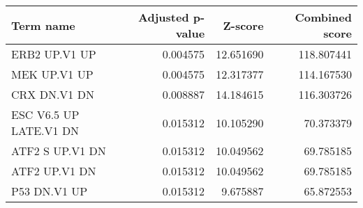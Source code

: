 \begin{tabular}{lrrr}
\toprule
             Term name &  Adjusted p-value &   Z-score &  Combined score \\
\midrule
         ERB2 UP.V1 UP &          0.004575 & 12.651690 &      118.807441 \\
          MEK UP.V1 UP &          0.004575 & 12.317377 &      114.167530 \\
          CRX DN.V1 DN &          0.008887 & 14.184615 &      116.303726 \\
ESC V6.5 UP LATE.V1 DN &          0.015312 & 10.105290 &       70.373379 \\
       ATF2 S UP.V1 DN &          0.015312 & 10.049562 &       69.785185 \\
         ATF2 UP.V1 DN &          0.015312 & 10.049562 &       69.785185 \\
          P53 DN.V1 UP &          0.015312 &  9.675887 &       65.872553 \\
\bottomrule
\end{tabular}
